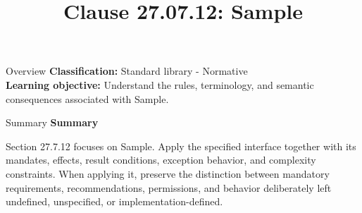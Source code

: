 \documentclass[10pt,letterpaper]{article}
\title{Clause 27.07.12: Sample}
\author{}
\date{}
\begin{document}
\maketitle
\begin{CornellOverviewBox}{Overview}
\textbf{Classification:} Standard library - Normative\\[2pt]
\textbf{Learning objective:} Understand the rules, terminology, and semantic consequences associated with Sample.
\end{CornellOverviewBox}\begin{CornellSummaryBox}{Summary}
{\sffamily\bfseries\color{Accent} Summary}\par\vspace{3pt}Section 27.7.12 focuses on Sample. Apply the specified interface together with its mandates, effects, result conditions, exception behavior, and complexity constraints. When applying it, preserve the distinction between mandatory requirements, recommendations, permissions, and behavior deliberately left undefined, unspecified, or implementation-defined.
\end{CornellSummaryBox}
\end{document}

